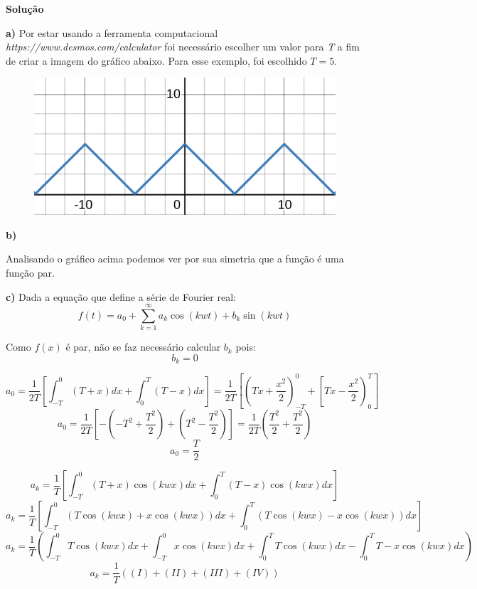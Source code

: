 \linespread{1.5}
\textbf{Solução}

\textbf{a)}
Por estar usando a ferramenta computacional \textit{https://www.desmos.com/calculator} foi necessário escolher um valor para \textit{T} a fim de criar a imagem do gráfico abaixo. Para esse exemplo, foi escolhido $T = 5$.

\begin{figure}[H]
    \centering
    \includegraphics[width=0.5\linewidth]{fig/sf5a.png}
\end{figure}

\textbf{b)}

Analisando o gráfico acima podemos ver por sua simetria que a função é uma função par.

\textbf{c)}
Dada a equação que define a série de Fourier real:
\begin{equation}
    \label{eq:Fourierserie}
    f(t) = a_0 + \sum_{k=1}^\infty a_k\cos{(kwt)} + b_k\sin{(kwt)}
\end{equation}

Como $f(x)$ é par, não se faz necessário calcular $b_k$ pois:
\begin{equation}
    \label{eq:sf5cbk}
    b_k = 0
\end{equation}

\begin{equation*}
    a_0 = \frac{1}{2T}\left[\int_{-T}^0 (T+x)dx + \int_0^T (T-x)dx \right] = \frac{1}{2T}\left[\left(Tx + \frac{x^2}{2}\right)^0_{-T} + \left[Tx - \frac{x^2}{2}\right)^T_0\right] 
\end{equation*}
\begin{equation*}
    a_0 = \frac{1}{2T}\left[-\left(-T^2 + \frac{T^2}{2}\right) + \left(T^2 - \frac{T^2}{2}\right)\right] = \frac{1}{2T}\left(\frac{T^2}{2} + \frac{T^2}{2}\right) 
\end{equation*}
\begin{equation}
    \label{eq:sf5ca0}
    a_0 = \frac{T}{2}
\end{equation}

\begin{equation*}
    a_k = \frac{1}{T}\left[\int_{-T}^0 (T+x)\cos{(kwx)}dx +  \int_0^T (T-x)\cos{(kwx)}dx \right]
\end{equation*}
\begin{equation*}
    a_k = \frac{1}{T}\left[\int_{-T}^0 (T\cos{(kwx)} + x\cos{(kwx)})dx + \int_0^T (T\cos{(kwx)} - x\cos{(kwx)})dx \right]
\end{equation*}
\begin{equation*}
    a_k = \frac{1}{T}\left(\int_{-T}^0 T\cos{(kwx)}dx + \int_{-T}^0 x\cos{(kwx)}dx + \int_0^T T\cos{(kwx)}dx - \int_0^T T -x\cos{(kwx)}dx \right)
\end{equation*}
\begin{equation*}
    a_k = \frac{1}{T}((I) + (II) + (III) + (IV)) 
\end{equation*}

